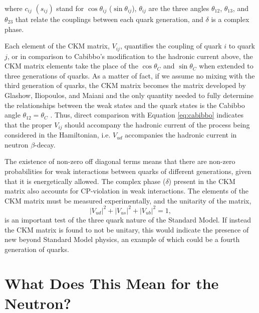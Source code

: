 \noindent where $c_{ij}$ $(s_{ij})$ stand for $\cos\theta_{ij}$ ($\sin\theta_{ij}$), $\theta_{ij}$
are the three angles $\theta_{12}$, $\theta_{13}$, and $\theta_{23}$ that relate the couplings
between each quark generation, and $\delta$ is a
complex phase.

Each element of the CKM matrix, $V_{ij}$, quantifies the coupling of quark $i$
to quark $j$, or in comparison to Cabibbo's modification to the hadronic current
above, the CKM matrix elements take the place of the $\cos\theta_C$ and $\sin\theta_C$
when extended to three generations of quarks. As a matter of fact, if we assume no mixing
with the third generation of quarks, the CKM matrix becomes the matrix developed by
Glashow, Iliopoulos, and Maiani and the only quantity needed to fully determine
the relationships between the weak states and the quark states is the Cabibbo angle $\theta_{12}=\theta_C$
\cite{griffiths2008}.
Thus, direct comparison with Equation \ref{eq:cabibbo} indicates that the proper
$V_{ij}$ should accompany the hadronic current
of the process being considered in the Hamiltonian, i.e. $V_{ud}$ accompanies the hadronic
current in neutron $\beta$-decay.

The existence of non-zero off diagonal terms means that there are non-zero probabilities for
weak interactions between quarks of different generations, given that it is energetically
allowed. The complex phase ($\delta$) present in the CKM
matrix also accounts for CP-violation in weak interactions.
The elements of the CKM matrix must be measured experimentally, and the unitarity of the matrix,
%
\begin{equation}
  |V_{ud}|^2 + |V_{us}|^2 + |V_{ub}|^2 = 1,
\end{equation}
is an important test of the three quark nature of the Standard Model. If
instead the CKM matrix is found to not be unitary, this would indicate the presence of
new beyond Standard Model physics, an example of which could be a fourth generation of quarks.


\section{What Does This Mean for the Neutron?}

